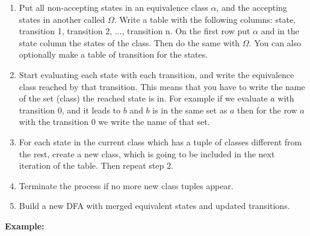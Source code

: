 \begin{enumerate}
    
    \item Put all non-accepting states in an equivalence class \(\alpha\), and the accepting states in another 
          called \(\Omega\). Write a table with the following columns: state, 
          transition 1, transition 2, ..., transition n. On the first row put \(\alpha\) and in the state column 
          the states of the class. Then do the same with \(\Omega\). You can also optionally make a table 
          of transition for the states.

    \item Start evaluating each state with each transition, and write the equivalence class reached by that transition. 
          This means that you have to write the name of the set (class) the reached state is in. For example if 
          we evaluate \(a\) with transition 0, and it leads to \(b\) and \(b\) is in the same set as \(a\) then for 
          the row \(a\) with the transition 0 we write the name of that set.

    \item  For each state in the current class which has a tuple of classes different from the rest, create 
           a new class, which is going to be included in the next iteration of the table. Then repeat step 2.

    \item Terminate the process if no more new class tuples appear.

    \item Build a new DFA with merged equivalent states and updated transitions.

\end{enumerate}

\textbf{Example:}

\begin{center}
\end{center}

